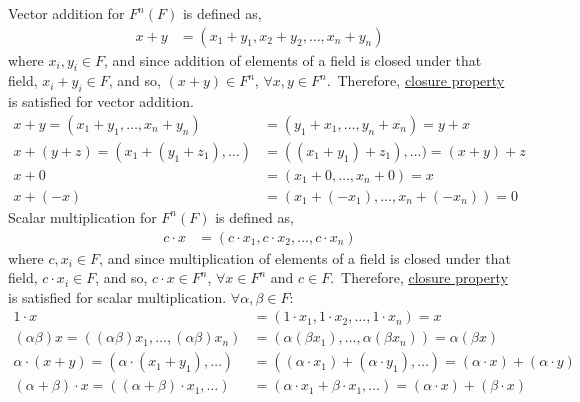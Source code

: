 \documentclass[12pt]{ipu-math}
\begin{document}
    \solution
    Vector addition for $F^n(F)$ is defined as,
    \begin{align*}
        x + y &= (x_1 + y_1, x_2 + y_2, \ldots, x_n + y_n)
    \end{align*}
    where $x_i,y_i \in F$, and since addition of elements of a field is closed under that field, $x_i + y_i \in F$,
    and so, $(x + y) \in F^n$, $\forall x,y \in F^n$.\ Therefore, \underline{closure property} is satisfied for vector
    addition.
    \begin{align*}
        x + y = (x_1 + y_1, \ldots, x_n + y_n) &= (y_1 + x_1, \ldots, y_n + x_n) = y + x \tag{Commutativity}\\
        x + (y + z) = (x_1 + (y_1 + z_1), \ldots) &= ((x_1 + y_1) + z_1), \ldots) = (x + y) + z \tag{Associativity}\\
        x + 0 &= (x_1 + 0, \ldots, x_n + 0) = x \tag{Additive Identity}\\
        x + (-x) &= (x_1 + (-x_1),\ldots,x_n + (-x_n)) = 0 \tag{Additive Inverse}
    \end{align*}%
    Scalar multiplication for $F^n(F)$ is defined as,
    \begin{align*}
        c \cdot x &= (c \cdot x_1, c \cdot x_2, \ldots, c \cdot x_n)
    \end{align*}%
    where $c, x_i \in F$, and since multiplication of elements of a field is closed under that field,
    $c \cdot x_i \in F$, and so, $c \cdot x \in F^n$, $\forall x \in F^n$ and $c \in F$.\ Therefore,
    \underline{closure property} is satisfied for scalar multiplication. $\forall \alpha,\beta \in F$:%
    \begin{align*}
        1 \cdot x &= (1 \cdot x_1, 1 \cdot x_2, \ldots, 1 \cdot x_n) = x \tag{Multiplicative Identity}\\
        (\alpha \beta) x
        = ((\alpha\beta) x_1, \ldots, (\alpha\beta) x_n)
        &= (\alpha(\beta x_1), \ldots, \alpha(\beta x_n))
        = \alpha(\beta x) \tag{Associativity}\\
        \alpha\cdot(x + y)
        = (\alpha\cdot(x_1 + y_1), \ldots)
        &= ((\alpha\cdot x_1) + (\alpha\cdot y_1), \ldots)
        = (\alpha\cdot x) + (\alpha\cdot y) \tag{Distributivity}\\
        (\alpha + \beta)\cdot x
        = ((\alpha + \beta)\cdot x_1, \ldots)
        &= (\alpha\cdot x_1 + \beta\cdot x_1, \ldots)
        = (\alpha\cdot x) + (\beta\cdot x) \tag{Distributivity}
    \end{align*}
\end{document}
